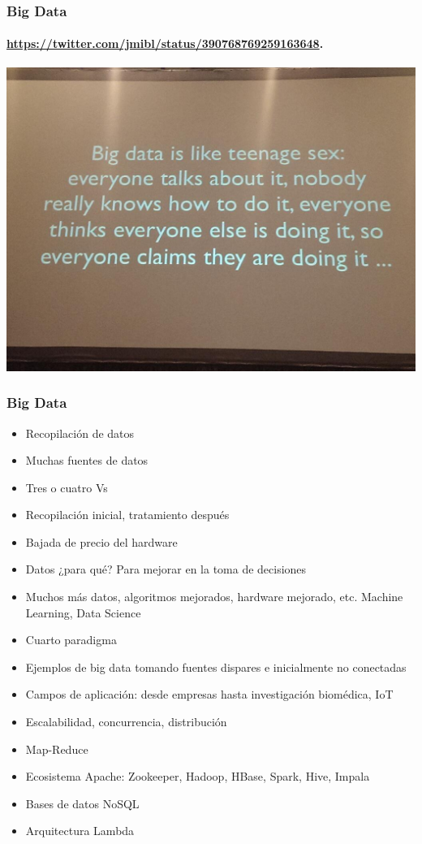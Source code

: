 \documentclass[14pt]{beamer}
\begin{document}
\begin{frame}
  \frametitle{Big Data}
  \framesubtitle{\url{https://twitter.com/jmibl/status/390768769259163648}.}
\centering\includegraphics[width=.9\textwidth]{img/big_data_sex}

\end{frame}

\begin{frame}[allowframebreaks]
  \frametitle{Big Data}
  \begin{itemize}
  \item Recopilación de datos
  \item Muchas fuentes de datos
  \item Tres o cuatro Vs
  \item Recopilación inicial, tratamiento después
  \item Bajada de precio del hardware
  \item Datos ¿para qué? Para mejorar en la toma de decisiones
  \item Muchos más datos, algoritmos mejorados, hardware mejorado, etc.
    Machine Learning, Data Science
  \item Cuarto paradigma
  \item Ejemplos de big data tomando fuentes dispares e inicialmente no
    conectadas
  \item Campos de aplicación: desde empresas hasta investigación biomédica,
    IoT
  \item Escalabilidad, concurrencia, distribución
  \item Map-Reduce
  \item Ecosistema Apache: Zookeeper, Hadoop, HBase, Spark, Hive, Impala
  \item Bases de datos NoSQL
  \item Arquitectura Lambda
  \end{itemize}
\end{frame}
\end{document}
